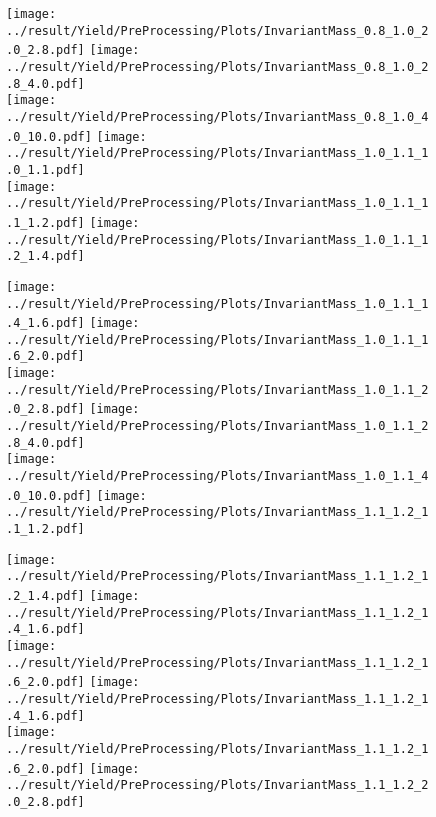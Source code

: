 \begin{figure}[!h]
	\centering
		\texttt{[image: ../result/Yield/PreProcessing/Plots/InvariantMass\_0.8\_1.0\_2.0\_2.8.pdf]}
		\texttt{[image: ../result/Yield/PreProcessing/Plots/InvariantMass\_0.8\_1.0\_2.8\_4.0.pdf]}\\
		\texttt{[image: ../result/Yield/PreProcessing/Plots/InvariantMass\_0.8\_1.0\_4.0\_10.0.pdf]}
		\texttt{[image: ../result/Yield/PreProcessing/Plots/InvariantMass\_1.0\_1.1\_1.0\_1.1.pdf]}\\
		\texttt{[image: ../result/Yield/PreProcessing/Plots/InvariantMass\_1.0\_1.1\_1.1\_1.2.pdf]}
		\texttt{[image: ../result/Yield/PreProcessing/Plots/InvariantMass\_1.0\_1.1\_1.2\_1.4.pdf]}
\end{figure}

\begin{figure}[!h]
	\centering
		\texttt{[image: ../result/Yield/PreProcessing/Plots/InvariantMass\_1.0\_1.1\_1.4\_1.6.pdf]}
		\texttt{[image: ../result/Yield/PreProcessing/Plots/InvariantMass\_1.0\_1.1\_1.6\_2.0.pdf]}\\
		\texttt{[image: ../result/Yield/PreProcessing/Plots/InvariantMass\_1.0\_1.1\_2.0\_2.8.pdf]}
		\texttt{[image: ../result/Yield/PreProcessing/Plots/InvariantMass\_1.0\_1.1\_2.8\_4.0.pdf]}\\
		\texttt{[image: ../result/Yield/PreProcessing/Plots/InvariantMass\_1.0\_1.1\_4.0\_10.0.pdf]}
		\texttt{[image: ../result/Yield/PreProcessing/Plots/InvariantMass\_1.1\_1.2\_1.1\_1.2.pdf]}
\end{figure}

\begin{figure}[!h]
	\centering
		\texttt{[image: ../result/Yield/PreProcessing/Plots/InvariantMass\_1.1\_1.2\_1.2\_1.4.pdf]}
		\texttt{[image: ../result/Yield/PreProcessing/Plots/InvariantMass\_1.1\_1.2\_1.4\_1.6.pdf]}\\
		\texttt{[image: ../result/Yield/PreProcessing/Plots/InvariantMass\_1.1\_1.2\_1.6\_2.0.pdf]}
		\texttt{[image: ../result/Yield/PreProcessing/Plots/InvariantMass\_1.1\_1.2\_1.4\_1.6.pdf]}	\\
		\texttt{[image: ../result/Yield/PreProcessing/Plots/InvariantMass\_1.1\_1.2\_1.6\_2.0.pdf]}
		\texttt{[image: ../result/Yield/PreProcessing/Plots/InvariantMass\_1.1\_1.2\_2.0\_2.8.pdf]}
\end{figure}

